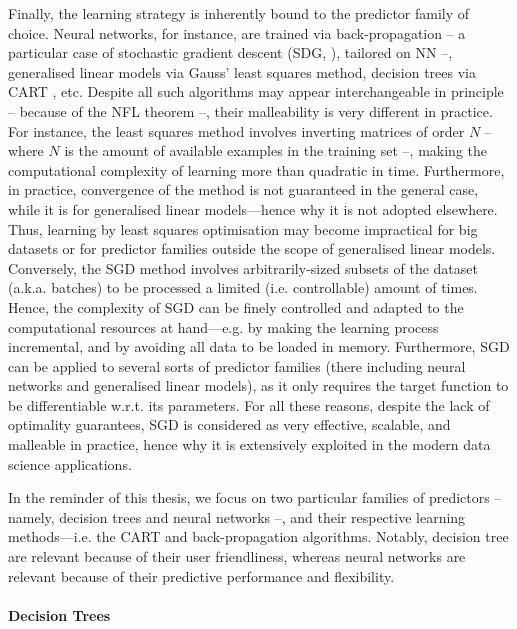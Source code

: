 \documentclass[12pt,a4paper,openright,twoside]{book}
\begin{document}
Finally, the learning strategy is inherently bound to the predictor family of choice.
%
Neural networks, for instance, are trained via back-propagation \cite{Rumelhart1986} -- a particular case of stochastic gradient descent (SDG, \cite{enwiki:SGD}), tailored on NN --, generalised linear models via Gauss' least squares method, decision trees via CART \cite{breiman1984classification}, etc.
%
Despite all such algorithms may appear interchangeable in principle -- because of the NFL theorem --, their malleability is very different in practice.
%
For instance, the least squares method involves inverting matrices of order $N$ -- where $N$ is the amount of available examples in the training set --, making the computational complexity of learning more than quadratic in time.
%
Furthermore, in practice, convergence of the method is not guaranteed in the general case, while it is for generalised linear models---hence why it is not adopted elsewhere.
%
Thus, learning by least squares optimisation may become impractical for big datasets or for predictor families outside the scope of generalised linear models.
%
Conversely, the SGD method involves arbitrarily-sized subsets of the dataset (a.k.a. batches) to be processed a limited (i.e. controllable) amount of times.
%
Hence, the complexity of SGD can be finely controlled and adapted to the computational resources at hand---e.g. by making the learning process incremental, and by avoiding all data to be loaded in memory.
%
Furthermore, SGD can be applied to several sorts of predictor families (there including neural networks and generalised linear models), as it only requires the target function to be differentiable w.r.t. its parameters.
%
For all these reasons, despite the lack of optimality guarantees, SGD is considered as very effective, scalable, and malleable in practice, hence why it is extensively exploited in the modern data science applications.

In the reminder of this thesis, we focus on two particular families of predictors -- namely, decision trees and neural networks --, and their respective learning methods---i.e. the CART \cite{breiman1984classification} and back-propagation \cite{Rumelhart1986} algorithms.
%
Notably, decision tree are relevant because of their user friendliness, whereas neural networks are relevant because of their predictive performance and flexibility.

\paragraph{Decision Trees}
\end{document}
